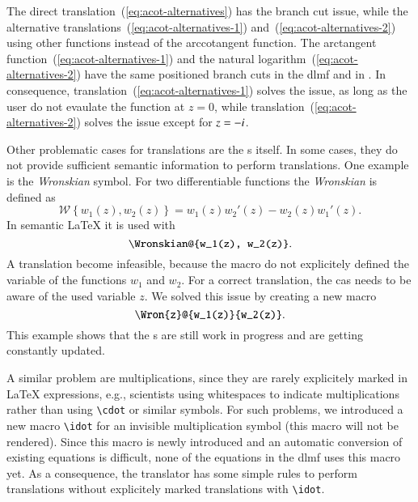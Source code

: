 The direct translation~(\ref{eq:acot-alternatives}) has the branch cut issue, while the alternative translations~(\ref{eq:acot-alternatives-1}) and~(\ref{eq:acot-alternatives-2}) using other functions instead of the arccotangent function. The arctangent function~(\ref{eq:acot-alternatives-1}) and the natural logarithm~(\ref{eq:acot-alternatives-2}) have the same positioned branch cuts in the \gls*{dlmf} and in \Maple. In consequence, translation~(\ref{eq:acot-alternatives-1}) solves the issue, as long as the user do not evaulate the function at $z = 0$, while translation~(\ref{eq:acot-alternatives-2}) solves the issue except for $z = -{i}$.

Other problematic cases for translations are the \Macro s itself. In some cases, they do not provide sufficient semantic information to perform translations. One example is the \textit{Wronskian} symbol. For two differentiable functions the \textit{Wronskian} is defined as~\parencite[eq. 1.13.4]{NIST:DLMF}
\begin{equation*}
	\mathscr{W} \left\{ w_1(z), w_2(z) \right\} = w_1(z)w_2'(z) - w_2(z)w_1'(z).
\end{equation*}
In semantic \LaTeX{} it is used with
\begin{equation}
	\verb|\Wronskian@{w_1(z), w_2(z)}|.
\end{equation}
A translation become infeasible, because the macro do not explicitely defined the variable of the functions $w_1$ and $w_2$. For a correct translation, the \gls*{cas} needs to be aware of the used variable $z$. We solved this issue by creating a new macro
\begin{equation}
	\verb|\Wron{z}@{w_1(z)}{w_2(z)}|.
\end{equation}
This example shows that the \Macro s are still work in progress and are getting constantly updated.

A similar problem are multiplications, since they are rarely explicitely marked in \LaTeX{} expressions, e.g., scientists using whitespaces to indicate multiplications rather than using \verb|\cdot| or similar symbols. For such problems, we introduced a new macro \verb|\idot| for an invisible multiplication symbol (this macro will not be rendered). Since this macro is newly introduced and an automatic conversion of existing equations is difficult, none of the equations in the \gls*{dlmf} uses this macro yet. As a consequence, the translator has some simple rules to perform translations without explicitely marked translations with \verb|\idot|.

